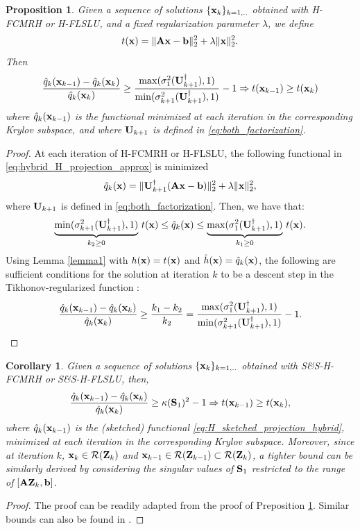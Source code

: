 \documentclass[11pt]{article}
\newtheorem{proposition}{Proposition}
\numberwithin{equation}{section}
\newtheorem{corollary}{Corollary}
\newcommand{\bfA}{{\bf A}}
\newcommand{\bfC}{{\bf C}}
\newcommand{\bfS}{{\bf S}}
\newcommand{\bfU}{{\bf U}}
\newcommand{\bfZ}{{\bf Z}}
\newcommand{\bfb}{{\bf b}}
\newcommand{\bfx}{{\bf x}}
\begin{document}
\begin{proposition}\label{prop2} Given a sequence of solutions $\{\bfx_k\}_{k=1,..	}$ obtained with H-FCMRH or H-FLSLU, and a fixed regularization parameter $\lambda$, we define
\[
t(\bfx)=\|\bfA\bfx-\bfb\|_2^2+\lambda\|\bfx\|_2^2.
\]
Then
\[\frac{\hat q_k(\bfx_{k-1})-\hat q_k(\bfx_{k})}{\hat q_k(\bfx_{k})} \geq \frac{\max(\sigma_1^2(\bfU_{k+1}^{\dagger}),1)}{\min(\sigma_{k+1}^2(\bfU_{k+1}^{\dagger}),1)}-1 \Rightarrow t(\bfx_{k-1}) \geq t(\bfx_k) \]
where $\hat q_k(\bfx_{k-1})$ is the functional minimized at each iteration in the corresponding Krylov subspace, and where $\bfU_{k+1}$ is defined in  \eqref{eq:both_factorization}.%
\end{proposition}
\begin{proof} At each iteration of H-FCMRH or H-FLSLU, the following functional in  \eqref{eq:hybrid_H_projection_approx} is minimized
\begin{equation*}
   \hat q_k(\bfx) = \| \bfU_{k+1}^{\dagger} (\bfA \bfx - \bfb) \|_2^2 +\lambda\|\bfx\|_2^2,
\end{equation*}
where $\bfU_{k+1}$ is defined in  \eqref{eq:both_factorization}. Then, we have that:
\begin{eqnarray*}
\underbrace{\min(\sigma_{k+1}^2(\bfU_{k+1}^{\dagger}),1)}_{k_2 \geq 0 } \,t(\bfx) \leq   \hat q_k(\bfx) \leq  \underbrace{\max(\sigma_1^2(\bfU_{k+1}^{\dagger}),1)}_{k_1 \geq 0 } \, t(\bfx).
\end{eqnarray*}
Using Lemma \ref{lemma1} with $h(\bfx)=t(\bfx)$ and $\hat h(\bfx) = \hat q_k(\bfx)$, the following are sufficient conditions for the solution at iteration $k$ to be a descent step in the Tikhonov-regularized function :
\[\frac{\hat q_k(\bfx_{k-1})-\hat q_k(\bfx_{k})}{\hat q_k(\bfx_{k})} \geq \frac{k_1-k_2}{k_2}=\frac{\max(\sigma_1^2(\bfU_{k+1}^{\dagger}),1)}{\min(\sigma_{k+1}^2(\bfU_{k+1}^{\dagger}),1)}-1.\]
\end{proof}
\begin{corollary} Given a sequence of solutions $\{\bfx_k\}_{k=1,..	}$ obtained with S\&S-H-FCMRH or S\&S-H-FLSLU, then,
\[
\frac{\hat q_k(\bfx_{k-1})-\hat q_k(\bfx_{k})}{\hat q_k(\bfx_{k})} \geq \kappa(\bfS_1)^2-1 \Rightarrow t(\bfx_{k-1})\geq  t(\bfx_k),
\]
where $\hat q_k(\bfx_{k-1})$ is the (sketched) functional \eqref{eq:H_sketched_projection_hybrid}, minimized at each iteration in the corresponding Krylov subspace. Moreover, since at iteration $k$, $\bfx_{k} \in \mathcal{R}(\bfZ_k)$ and $\bfx_{k-1} \in \mathcal{R}(\bfZ_{k-1})\subset \mathcal{R}(\bfZ_k)$, a tighter bound can be similarly derived by considering the singular values of $\bfS_1$ restricted to the range of $[\bfA \bfZ_k,\bfb]$. 
\end{corollary}
\begin{proof}
The proof can be readily adapted from the proof of Preposition \ref{prop2}. Similar bounds can also be found in \cite{Sabate2025rand}.
\end{proof}
\end{document}
